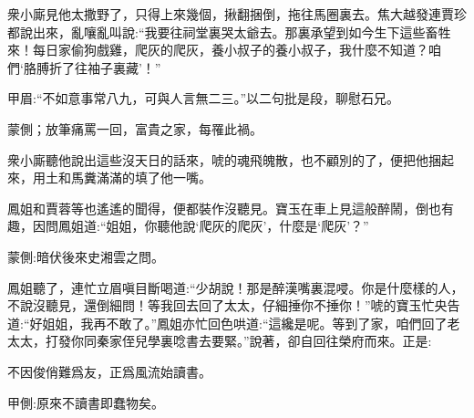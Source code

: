 \begin{parag}
    衆小廝見他太撒野了，只得上來幾個，揪翻捆倒，拖往馬圈裏去。焦大越發連賈珍都說出來，亂嚷亂叫說:“我要往祠堂裏哭太爺去。那裏承望到如今生下這些畜牲來！每日家偷狗戲雞，爬灰的爬灰，養小叔子的養小叔子，我什麼不知道？咱們‘胳膊折了往袖子裏藏’！”\begin{note}甲眉:“不如意事常八九，可與人言無二三。”以二句批是段，聊慰石兄。\end{note}\begin{note}蒙側；放筆痛罵一回，富貴之家，每罹此禍。\end{note}衆小廝聽他說出這些沒天日的話來，唬的魂飛魄散，也不顧別的了，便把他捆起來，用土和馬糞滿滿的填了他一嘴。
\end{parag}


\begin{parag}
    鳳姐和賈蓉等也遙遙的聞得，便都裝作沒聽見。寶玉在車上見這般醉鬧，倒也有趣，因問鳳姐道:“姐姐，你聽他說‘爬灰的爬灰’，什麼是‘爬灰’？”\begin{note}蒙側:暗伏後來史湘雲之問。\end{note}鳳姐聽了，連忙立眉嗔目斷喝道:“少胡說！那是醉漢嘴裏混唚。你是什麼樣的人，不說沒聽見，還倒細問！等我回去回了太太，仔細捶你不捶你！”唬的寶玉忙央告道:“好姐姐，我再不敢了。”鳳姐亦忙回色哄道:“這纔是呢。等到了家，咱們回了老太太，打發你同秦家侄兒學裏唸書去要緊。”說著，卻自回往榮府而來。正是:
\end{parag}


\begin{poem}
    \begin{pl} 不因俊俏難爲友，正爲風流始讀書。\end{pl}
    \begin{note}甲側:原來不讀書即蠢物矣。\end{note}
\end{poem}
